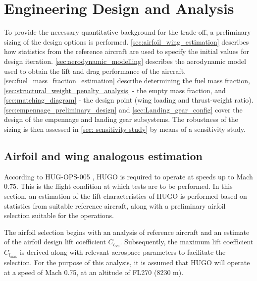 \chapter{Engineering Design and Analysis}
\label{ch:engineering_design}
To provide the necessary quantitative background for the trade-off, a preliminary sizing of the design options is performed. \autoref{sec:airfoil_wing_estimation} describes how statistics from the reference aircraft are used to specify the initial values for design iteration. \autoref{sec:aerodynamic_modelling} describes the aerodynamic model used to obtain the lift and drag performance of the aircraft. \autoref{sec:fuel_mass_fraction_estimation} describe determining the fuel mass fraction, \autoref{sec:structural_weight_penalty_analysis} - the empty mass fraction, and \autoref{sec:matching_diagram} - the design point (wing loading and thrust-weight ratio). \autoref{sec:empennage_preliminary_design} and \autoref{sec:Landing_gear_config} cover the design of the empennage and landing gear subsystems. The robustness of the sizing is then assessed in \autoref{sec: sensitivity study} by means of a sensitivity study.

\section{Airfoil and wing analogous estimation}
\label{sec:airfoil_wing_estimation}
According to HUG-OPS-005 , HUGO is required to operate at speeds up to Mach 0.75. This is the flight condition at which tests are to be performed. In this section, an estimation of the lift characteristics of HUGO is performed based on statistics from suitable reference aircraft, along with a preliminary airfoil selection suitable for the operations.

The airfoil selection begins with an analysis of reference aircraft and an estimate of the airfoil design lift coefficient $C_{l_\text{des}}$. Subsequently, the maximum lift coefficient $C_{l_{\text{max}}}$ is derived along with relevant aerospace parameters to facilitate the selection. For the purpose of this analysis, it is assumed that HUGO will operate at a speed of Mach 0.75, at an altitude of FL270 (8230 m). 

